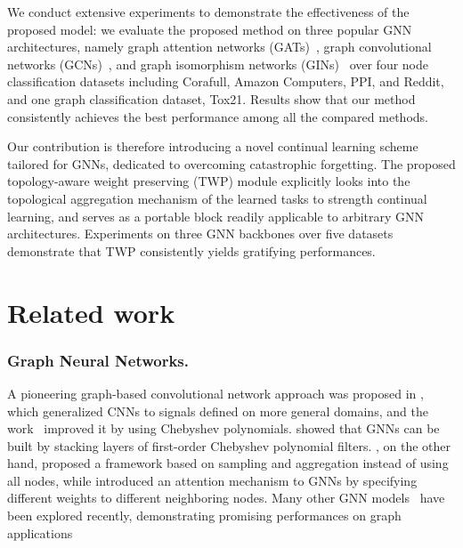 \documentclass[letterpaper]{article} %
\begin{document}
We conduct extensive experiments to 
demonstrate the effectiveness
of the proposed model:
we evaluate the proposed method 
on three popular GNN architectures, 
namely {graph attention networks (GATs)~\cite{velivckovic2017graph}, graph convolutional networks (GCNs)~\cite{kipf2016semi}, and graph isomorphism networks (GINs)~\cite{xu2018powerful}}
over  four node classification datasets including 
Corafull, Amazon Computers, PPI, and Reddit, 
and one graph classification dataset, Tox21.
Results show that our method consistently achieves
the best performance among all the compared methods.

Our contribution is therefore 
introducing a novel
continual learning scheme tailored
for GNNs, dedicated to overcoming  
catastrophic forgetting.
The proposed topology-aware weight preserving (TWP) module
explicitly looks into the topological
aggregation mechanism of the learned tasks
to strength continual learning,
and serves as a portable block 
readily applicable to arbitrary GNN architectures. 
Experiments on three GNN backbones over five datasets
demonstrate that TWP consistently yields 
gratifying performances.





\section{Related work}

\subsubsection{Graph Neural Networks.}
A pioneering graph-based convolutional network approach was proposed in \cite{bruna2013spectral}, which generalized CNNs to signals defined on more general domains, and the work~\cite{defferrard2016convolutional} improved it 
by using Chebyshev polynomials. 
\cite{kipf2016semi} showed that GNNs can be built by stacking layers of first-order Chebyshev polynomial filters.
\cite{hamilton2017inductive}, on the other hand, proposed a framework based on sampling and aggregation instead of using all nodes,
while \cite{velivckovic2017graph} introduced an attention mechanism to GNNs 
by specifying different weights to different  neighboring nodes.
Many other GNN models~\cite{spagan,yang2020factorizable} 
have been explored recently, demonstrating promising performances
on graph applications~\cite{qiu2020hallucinating,WangECCV14} 
\end{document}
